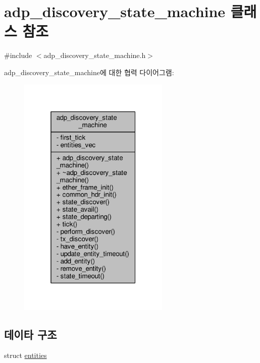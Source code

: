 \hypertarget{classavdecc__lib_1_1adp__discovery__state__machine}{}\section{adp\+\_\+discovery\+\_\+state\+\_\+machine 클래스 참조}
\label{classavdecc__lib_1_1adp__discovery__state__machine}


{\ttfamily \#include $<$adp\+\_\+discovery\+\_\+state\+\_\+machine.\+h$>$}



adp\+\_\+discovery\+\_\+state\+\_\+machine에 대한 협력 다이어그램\+:
\nopagebreak
\begin{figure}[H]
\begin{center}
\leavevmode
\includegraphics[width=205pt]{classavdecc__lib_1_1adp__discovery__state__machine__coll__graph}
\end{center}
\end{figure}
\subsection*{데이타 구조}
\begin{DoxyCompactItemize}
\item 
struct \hyperlink{structavdecc__lib_1_1adp__discovery__state__machine_1_1entities}{entities}
\end{DoxyCompactItemize}
